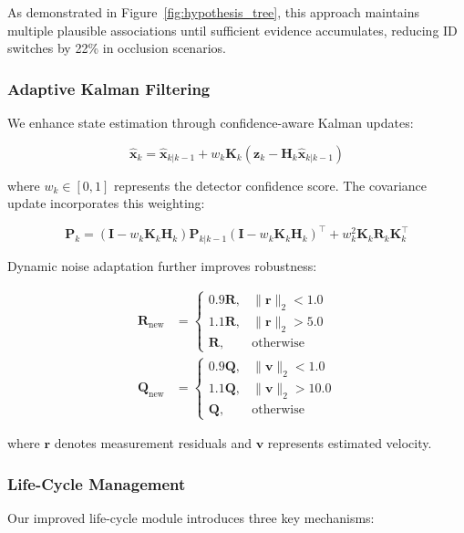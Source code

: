 As demonstrated in Figure~\ref{fig:hypothesis_tree}, this approach maintains multiple plausible associations until sufficient evidence accumulates, reducing ID switches by 22\% in occlusion scenarios.

\subsubsection{Adaptive Kalman Filtering}
We enhance state estimation through confidence-aware Kalman updates:

\begin{equation}
\hat{\mathbf{x}}_k = \hat{\mathbf{x}}_{k|k-1} + w_k\mathbf{K}_k(\mathbf{z}_k - \mathbf{H}_k\hat{\mathbf{x}}_{k|k-1})
\label{eq:XK}
\end{equation}

where $w_k \in [0,1]$ represents the detector confidence score. The covariance update incorporates this weighting:

\begin{equation}
\mathbf{P}_k = (\mathbf{I} - w_k\mathbf{K}_k\mathbf{H}_k)\mathbf{P}_{k|k-1}(\mathbf{I} - w_k\mathbf{K}_k\mathbf{H}_k)^\top + w_k^2\mathbf{K}_k\mathbf{R}_k\mathbf{K}_k^\top
\label{eq:PK}
\end{equation}

Dynamic noise adaptation further improves robustness:

\begin{align}
\mathbf{R}_{\mathrm{new}} &= \begin{cases}
0.9\mathbf{R}, & \|\mathbf{r}\|_2 < 1.0 \\
1.1\mathbf{R}, & \|\mathbf{r}\|_2 > 5.0 \\
\mathbf{R}, & \text{otherwise}
\end{cases} \\
\mathbf{Q}_{\mathrm{new}} &= \begin{cases}
0.9\mathbf{Q}, & \|\mathbf{v}\|_2 < 1.0 \\
1.1\mathbf{Q}, & \|\mathbf{v}\|_2 > 10.0 \\
\mathbf{Q}, & \text{otherwise}
\end{cases}
\label{eq:noise_adaptation}
\end{align}

where $\mathbf{r}$ denotes measurement residuals and $\mathbf{v}$ represents estimated velocity.

\subsubsection{Life-Cycle Management}
Our improved life-cycle module introduces three key mechanisms:

